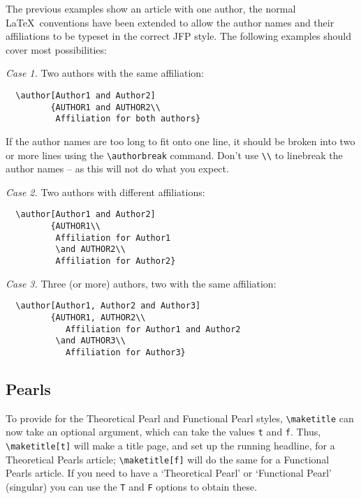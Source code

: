 \documentclass{jfp1}
\begin{document}
The previous examples show an article with one author, the normal
\LaTeX\ conventions have been extended to allow the author names and
their affiliations to be typeset in the correct JFP style. The following
examples should cover most possibilities:

\textit{Case 1.} Two authors with the same affiliation:
%
\begin{verbatim}
  \author[Author1 and Author2]
         {AUTHOR1 and AUTHOR2\\
          Affiliation for both authors}
\end{verbatim}
%
If the author names are too long to fit onto one line, it should be
broken into two or more lines using the \verb"\authorbreak" command.
Don't use \verb"\\" to linebreak the author names -- as this will not do what
you expect.

\textit{Case 2.} Two authors with different affiliations:
%
\begin{verbatim}
  \author[Author1 and Author2]
         {AUTHOR1\\
          Affiliation for Author1
          \and AUTHOR2\\
          Affiliation for Author2}
\end{verbatim}

\textit{Case 3.} Three (or more) authors, two with the same affiliation:
%
\begin{verbatim}
  \author[Author1, Author2 and Author3]
         {AUTHOR1, AUTHOR2\\
            Affiliation for Author1 and Author2
          \and AUTHOR3\\
            Affiliation for Author3}
\end{verbatim}

\subsection{Pearls}

To provide for the Theoretical Pearl and Functional Pearl styles,
\verb"\maketitle" can now take an optional argument, which can take the
values \verb"t" and \verb"f". Thus, \verb"\maketitle[t]" will make a
title page, and set up the running headline, for a \linebreak Theoretical
Pearls article; \verb"\maketitle[f]" will do the same for a Functional Pearls
article.
If you need to have a `Theoretical Pearl' or `Functional Pearl' (singular)
you can use the \verb"T" and \verb"F" options to obtain these.
\end{document}
